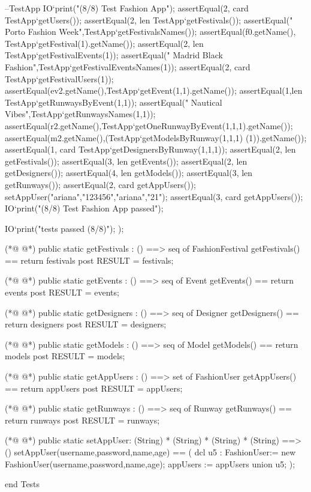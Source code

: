 \begin{vdmpp}[breaklines=true]
     --TestApp
      IO`print("(8/8) Test Fashion App\n");
      assertEqual(2, card TestApp`getUsers());
      assertEqual(2, len TestApp`getFestivals());
      assertEqual(" Porto Fashion Week\n",TestApp`getFestivalsNames());
      assertEqual(f0.getName(), TestApp`getFestival(1).getName());
     assertEqual(2, len TestApp`getFestivalEvents(1));
     assertEqual(" Madrid Black Fashion",TestApp`getFestivalEventsNames(1));
     assertEqual(2, card TestApp`getFestivalUsers(1));
     assertEqual(ev2.getName(),TestApp`getEvent(1,1).getName());
    assertEqual(1,len TestApp`getRunwaysByEvent(1,1));
    assertEqual(" Nautical Vibes",TestApp`getRunwaysNames(1,1));
    assertEqual(r2.getName(),TestApp`getOneRunwayByEvent(1,1,1).getName());
    assertEqual(m2.getName(),(TestApp`getModelsByRunway(1,1,1) (1)).getName());
    assertEqual(1, card TestApp`getDesignersByRunway(1,1,1));
    assertEqual(2, len getFestivals());
    assertEqual(3, len getEvents());
    assertEqual(2, len getDesigners());
    assertEqual(4, len getModels());
    assertEqual(3, len getRunways());
    assertEqual(2, card getAppUsers());
    setAppUser("ariana","123456","ariana","21");
    assertEqual(3, card getAppUsers());
    IO`print("\n(8/8) Test Fashion App passed\n");
    
    
    IO`print("\nAll tests passed (8/8)\n");
  );
  
(*@
\label{getFestivals:228}
@*)
  public  static getFestivals : () ==> seq of FashionFestival
  getFestivals() == return festivals
  post RESULT = festivals;
  
(*@
\label{getEvents:232}
@*)
  public  static getEvents : () ==> seq of Event
  getEvents() == return events
  post RESULT = events;
  
(*@
\label{getDesigners:236}
@*)
  public  static getDesigners : () ==> seq of Designer
  getDesigners() == return designers
  post RESULT = designers;
   
(*@
\label{getModels:240}
@*)
 public  static getModels : () ==> seq of Model
  getModels() == return models
  post RESULT = models;
    
(*@
\label{getAppUsers:244}
@*)
  public  static getAppUsers : () ==> set of FashionUser
  getAppUsers() == return appUsers
  post RESULT = appUsers;
    
(*@
\label{getRunways:248}
@*)
  public  static getRunways : () ==> seq of Runway
  getRunways() == return runways
  post RESULT = runways;
    
(*@
\label{setAppUser:252}
@*)
  public static setAppUser: (String) *  (String) * (String) * (String) ==> ()
  setAppUser(username,password,name,age) == 
  (
   dcl u5 : FashionUser:= new FashionUser(username,password,name,age);
   appUsers := appUsers union {u5};
   );
   
 
 
end Tests
\end{vdmpp}
